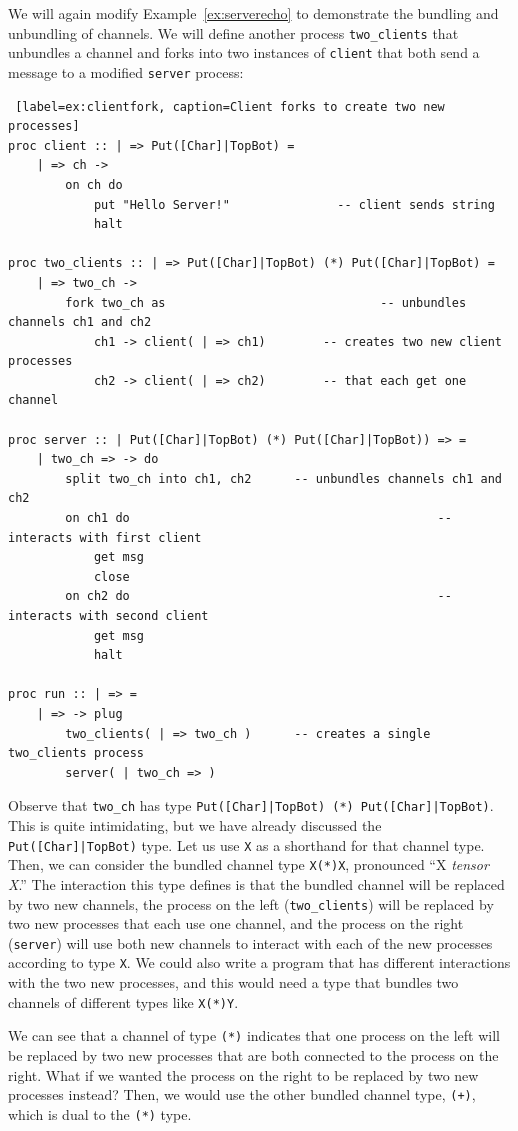 \documentclass[11pt]{article}
\begin{document}
We will again modify Example~\ref{ex:serverecho} to demonstrate the bundling and unbundling of channels.
We will define another process \lstinline$two_clients$ that unbundles a channel and forks into two instances of \lstinline$client$ that both send a message to a modified \lstinline$server$ process:
\begin{lstlisting} [label=ex:clientfork, caption=Client forks to create two new processes] 
proc client :: | => Put([Char]|TopBot) = 		
	| => ch ->
		on ch do 
			put "Hello Server!"				  -- client sends string
			halt

proc two_clients :: | => Put([Char]|TopBot) (*) Put([Char]|TopBot) =
	| => two_ch ->
		fork two_ch as								-- unbundles channels ch1 and ch2
			ch1 -> client( | => ch1)		-- creates two new client processes
			ch2 -> client( | => ch2)		-- that each get one channel

proc server :: | Put([Char]|TopBot) (*) Put([Char]|TopBot)) => =  
	| two_ch => -> do
		split two_ch into ch1, ch2		-- unbundles channels ch1 and ch2
		on ch1 do											-- interacts with first client
			get msg						
			close
		on ch2 do											-- interacts with second client
			get msg						
			halt
			
proc run :: | => = 
 	| => -> plug						
 		two_clients( | => two_ch )		-- creates a single two_clients process
 		server( | two_ch => )				
\end{lstlisting}
Observe that \lstinline$two_ch$ has type \lstinline$Put([Char]|TopBot) (*) Put([Char]|TopBot)$.
This is quite intimidating, but we have already discussed the \lstinline$Put([Char]|TopBot)$ type.
Let us use \lstinline$X$ as a shorthand for that channel type.
Then, we can consider the bundled channel type \lstinline$X(*)X$, pronounced ``{X \em tensor X}.''
The interaction this type defines is that the bundled channel will be replaced by two new channels, the process on the left (\lstinline$two_clients$) will be replaced by two new processes that each use one channel, and the process on the right (\lstinline$server$) will use both new channels to interact with each of the new processes according to type \lstinline$X$.
We could also write a program that has different interactions with the two new processes, and this would need a type that bundles two channels of different types like \lstinline$X(*)Y$.

We can see that a channel of type \lstinline$(*)$ indicates that one process on the left will be replaced by two new processes that are both connected to the process on the right.
What if we wanted the process on the right to be replaced by two new processes instead?
Then, we would use the other bundled channel type, \lstinline$(+)$, which is dual to the \lstinline$(*)$ type.
\end{document}
